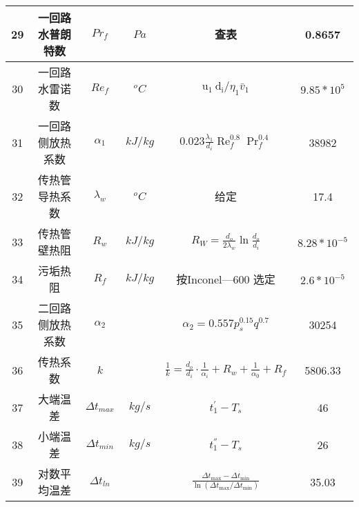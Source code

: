 \begin{table}[H]
{\begin{tabular}{|c|c|c|c|c|c|}
            29   & 一回路水普朗特数 & $ Pr_f $            & $ Pa $    & 查表                                                                                               & 0.8657           \\ \hline
            30   & 一回路水雷诺数   & $ Re_f $            & $ ^oC $   & $ \mathrm{u}_{1} \mathrm{~d}_{\mathrm{i}} / \eta_{1} \bar{v}_{1} $                                 & $ 9.85*10^{5} $  \\ \hline
            31   & 一回路侧放热系数 & $ \alpha_1 $        & $ kJ/kg $ & $ 0.023 \frac{\lambda_{1}}{d_{i}} \operatorname{Re}_{f}^{0.8} \operatorname{Pr}_{f}^{0.4} $        & 38982            \\ \hline
            32   & 传热管导热系数   & $ \lambda_w $       & $ ^oC $   & 给定                                                                                               & 17.4             \\ \hline
            33   & 传热管壁热阻     & $ R_w $             & $ kJ/kg $ & $ R_{W}=\frac{d_{o}}{2 \lambda_{w}} \ln \frac{d_{o}}{d_{i}} $                                      & $ 8.28*10^{-5} $ \\ \hline
            34   & 污垢热阻         & $ R_f $             & $ kJ/kg $ & 按Inconel—600 选定                                                                                 & $ 2.6*10^{-5} $  \\ \hline
            35   & 二回路侧放热系数 & $ \alpha_2 $        &           & $ \alpha_{2}=0.557 p_{s}^{0.15} q^{0.7} $                                                          & 30254            \\ \hline
            36   & 传热系数         & $ k $               &           & $ \frac{1}{k}=\frac{d_{o}}{d_{i}} \cdot \frac{1}{\alpha_{i}}+R_{w}+\frac{1}{\alpha_{0}}+R_{f} $    & 5806.33          \\ \hline
            37   & 大端温差         & $ \Delta t_{max} $  & $ kg/s $  & $ t_{1}^{'} - T_s $                                                                                & 46               \\ \hline
            38   & 小端温差         & $ \Delta t_{min} $  & $ kg/s $  & $ t_{1}^{''} - T_s $                                                                               & 26               \\ \hline
            39   & 对数平均温差     & $ \Delta t_{ln} $   &           & $ \frac{\Delta t_{\max }-\Delta t_{\min }}{\ln \left(\Delta t_{\max } / \Delta t_{\min }\right)} $ & 35.03            \\ \hline

\end{tabular}}
\end{table}
